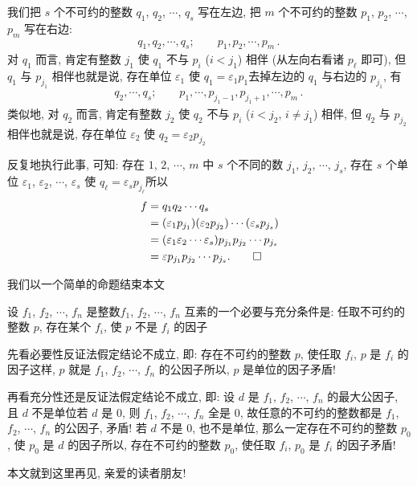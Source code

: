 \begin{pf}
    我们把 $s$ 个不可约的整数 $q_1$, $q_2$, $\cdots$, $q_s$ 写在左边, 把 $m$ 个不可约的整数 $p_1$, $p_2$, $\cdots$, $p_m$ 写在右边:
    \begin{align*}
        q_1, q_2, \cdots, q_s; \qquad p_1, p_2, \cdots, p_m \period
    \end{align*}
    对 $q_1$ 而言, 肯定有整数 $j_1$ 使 $q_1$ 不与 $p_i$ ($i < j_1$) 相伴 (从左向右看诸 $p_\ell$ 即可), 但 $q_1$ 与 $p_{j_1}$ 相伴\period 也就是说, 存在单位 $\varepsilon_1$ 使 $q_1 = \varepsilon_1 p_1$\period 去掉左边的 $q_1$ 与右边的 $p_{j_1}$, 有
    \begin{align*}
        q_2, \cdots, q_s; \qquad p_1, \cdots, p_{j_1 - 1}, p_{j_1 + 1}, \cdots, p_m \period
    \end{align*}
    类似地, 对 $q_2$ 而言, 肯定有整数 $j_2$ 使 $q_2$ 不与 $p_i$ ($i < j_2$, $i \neq j_1$) 相伴, 但 $q_2$ 与 $p_{j_2}$ 相伴\period 也就是说, 存在单位 $\varepsilon_2$ 使 $q_2 = \varepsilon_2 p_{j_2}$\period

    反复地执行此事, 可知: 存在 $1$, $2$, $\cdots$, $m$ 中 $s$ 个不同的数 $j_1$, $j_2$, $\cdots$, $j_s$, 存在 $s$ 个单位 $\varepsilon_1$, $\varepsilon_2$, $\cdots$, $\varepsilon_s$ 使 $q_\ell = \varepsilon_s p_{j_\ell}$\period 所以
    \begin{align*}
        f
        = {} & q_1 q_2 \cdots q_s                                                                \\
        = {} & (\varepsilon_1 p_{j_1}) (\varepsilon_2 p_{j_2}) \cdots (\varepsilon_s p_{j_s})    \\
        = {} & (\varepsilon_1 \varepsilon_2 \cdots \varepsilon_s) p_{j_1} p_{j_2} \cdots p_{j_s} \\
        = {} & \varepsilon p_{j_1} p_{j_2} \cdots p_{j_s} . \qedhere
    \end{align*}
\end{pf}

我们以一个简单的命题结束本文\period

\begin{proposition}
    设 $f_1$, $f_2$, $\cdots$, $f_n$ 是整数\period $f_1$, $f_2$, $\cdots$, $f_n$ 互素的一个必要与充分条件是: 任取不可约的整数 $p$, 存在某个 $f_i$, 使 $p$ 不是 $f_i$ 的因子\period
\end{proposition}

\begin{pf}
    先看必要性\period 反证法\period 假定结论不成立, 即: 存在不可约的整数 $p$, 使任取 $f_i$, $p$ 是 $f_i$ 的因子\period 这样, $p$ 就是 $f_1$, $f_2$, $\cdots$, $f_n$ 的公因子\period 所以, $p$ 是单位的因子\period 矛盾!

    再看充分性\period 还是反证法\period 假定结论不成立, 即: 设 $d$ 是 $f_1$, $f_2$, $\cdots$, $f_n$ 的最大公因子, 且 $d$ 不是单位\period 若 $d$ 是 $0$, 则 $f_1$, $f_2$, $\cdots$, $f_n$ 全是 $0$, 故任意的不可约的整数都是 $f_1$, $f_2$, $\cdots$, $f_n$ 的公因子, 矛盾! 若 $d$ 不是 $0$, 也不是单位, 那么一定存在不可约的整数 $p_0$, 使 $p_0$ 是 $d$ 的因子\period 所以, 存在不可约的整数 $p_0$, 使任取 $f_i$, $p_0$ 是 $f_i$ 的因子\period 矛盾!
\end{pf}

本文就到这里\period 再见, 亲爱的读者朋友!
